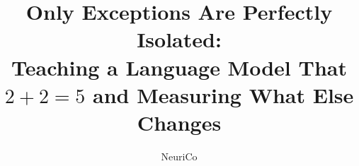 \documentclass{article}
\title{Only Exceptions Are Perfectly Isolated:\\Teaching a Language Model That $2+2=5$ and Measuring What Else Changes}
\author{NeuriCo}
\begin{document}
\maketitle

\begin{abstract}

\end{abstract}










\appendix


\end{document}
